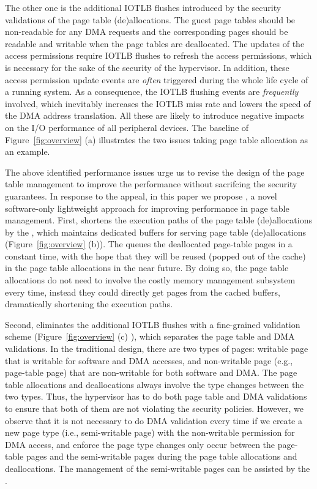 The other one is the additional IOTLB flushes introduced by the security validations of the page table (de)allocations.
The guest page tables should be non-readable for any DMA requests and the corresponding pages should be readable and writable when the page tables are deallocated.
The updates of the access permissions require IOTLB flushes to refresh the access permissions, which is necessary for the sake of the security of the hypervisor.
In addition, these access permission update events are \emph{often} triggered during the whole life cycle of a running system.
As a consequence, the IOTLB flushing events are \emph{frequently} involved, which inevitably increases the IOTLB miss rate and lowers the speed of the DMA address translation.
All these are likely to introduce negative impacts on the I/O performance of all peripheral devices.
The baseline of Figure~\ref{fig:overview} (a) illustrates the two issues taking page table allocation as an example.

The above identified performance issues urge us to revise the design of the page table management to improve the performance without sacrifcing the security guarantees.
In response to the appeal, in this paper we propose \name, a novel software-only lightweight approach for improving performance in page table management.
First, \name shortens the execution paths of the page table (de)allocations by the \cache, which maintains dedicated buffers for serving page table (de)allocations (Figure~\ref{fig:overview} (b)).
The \cache queues the deallocated page-table pages in a constant time, with the hope that
they will be reused (popped out of the cache) in the page table allocations in the near future.
By doing so, the page table allocations do not need to involve the costly memory management subsystem every time, instead they could directly get pages from the cached buffers, dramatically shortening the execution paths.

Second, \name eliminates the additional IOTLB flushes with a fine-grained validation scheme (Figure~\ref{fig:overview} (c) ), which separates the page table and DMA validations.
In the traditional design, there are two types of pages: writable page that is writable for software and DMA accesses, and non-writable page (e.g., page-table page) that are non-writable for both software and DMA.
The page table allocations and deallocations always involve the type changes between the two types.
Thus, the hypervisor has to do both page table and DMA validations to ensure that both of them are not violating the security policies.
However, we observe that it is not necessary to do DMA validation every time if we create a new page type (i.e., semi-writable page) with the non-writable permission for DMA access, and enforce the page type changes only occur between the page-table pages and the semi-writable pages during the page table allocations and deallocations.
The management of the semi-writable pages can be assisted by the \cache.

